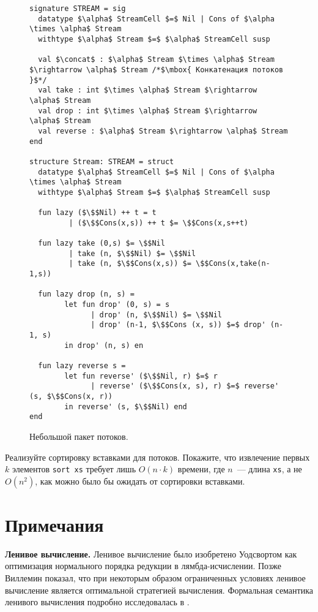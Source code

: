 \begin{figure}
  \centering
\begin{lstlisting}
signature STREAM = sig
  datatype $\alpha$ StreamCell $=$ Nil | Cons of $\alpha \times \alpha$ Stream
  withtype $\alpha$ Stream $=$ $\alpha$ StreamCell susp

  val $\concat$ : $\alpha$ Stream $\times \alpha$ Stream $\rightarrow \alpha$ Stream /*$\mbox{ Конкатенация потоков }$*/
  val take : int $\times \alpha$ Stream $\rightarrow \alpha$ Stream
  val drop : int $\times \alpha$ Stream $\rightarrow \alpha$ Stream
  val reverse : $\alpha$ Stream $\rightarrow \alpha$ Stream
end

structure Stream: STREAM = struct
  datatype $\alpha$ StreamCell $=$ Nil | Cons of $\alpha \times \alpha$ Stream
  withtype $\alpha$ Stream $=$ $\alpha$ StreamCell susp

  fun lazy ($\$$Nil) ++ t = t
         | ($\$$Cons(x,s)) ++ t $= \$$Cons(x,s++t)

  fun lazy take (0,s) $= \$$Nil
         | take (n, $\$$Nil) $= \$$Nil
         | take (n, $\$$Cons(x,s)) $= \$$Cons(x,take(n-1,s))

  fun lazy drop (n, s) =
        let fun drop' (0, s) = s
              | drop' (n, $\$$Nil) $= \$$Nil
              | drop' (n-1, $\$$Cons (x, s)) $=$ drop' (n-1, s)
        in drop' (n, s) en

  fun lazy reverse s =
        let fun reverse' ($\$$Nil, r) $=$ r
              | reverse' ($\$$Cons(x, s), r) $=$ reverse' (s, $\$$Cons(x, r))
        in reverse' (s, $\$$Nil) end
end
\end{lstlisting}
  \centering
  \caption{Небольшой пакет потоков.}
  \label{fig:4.1}
\end{figure}

\begin{exercise}\label{ex:4.2}
  Реализуйте сортировку вставками для потоков. Покажите, что
  извлечение первых $k$ элементов \lstinline!sort xs! требует лишь
  $O (n \cdot k)$ времени, где $n$~--- длина \lstinline!xs!, а не
  $O(n^2)$, как можно было бы ожидать от сортировки вставками.
\end{exercise}

\section{Примечания}
\label{sc:4.3}

\textbf{Ленивое вычисление.} Ленивое вычисление было изобретено
Уодсвортом \cite{Wadsworth1971} как оптимизация нормального порядка
редукции в лямбда-исчислении. Позже Виллемин \cite{Vuillemin1974}
показал, что при некоторым образом ограниченных условиях ленивое
вычисление является оптимальной стратегией вычисления. Формальная
семантика ленивого вычисления подробно исследовалась в
\cite{Josephs1989, Launchbury1993, OkasakiLeeTarditi1994, Ariola-etal1995}.

